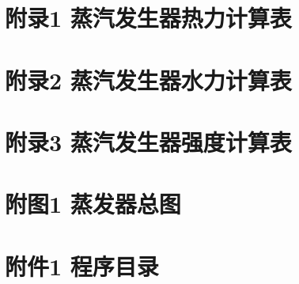 \setcounter{page}{1}
\begin{appendices}
	\newpage
	\section{附录1 蒸汽发生器热力计算表}
	

	\newpage
	\section{附录2 蒸汽发生器水力计算表}
	

	\newpage
	\section{附录3 蒸汽发生器强度计算表}
	

	\newpage
	\section{附图1 蒸发器总图}
	


	\newpage
	\section{附件1 程序目录}
	
\end{appendices}